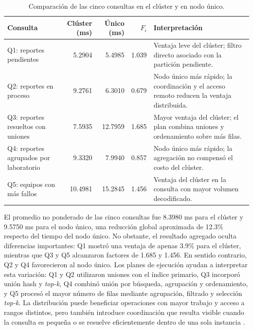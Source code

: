 \documentclass[12pt,a4paper]{article}
\begin{document}
\begin{table}[H]
  \centering
  \caption{Comparación de las cinco consultas en el clúster y en nodo único.}
  \label{tab:comparacion-cluster-single}
  \scriptsize
  \begin{tabular}{@{}p{4.1cm}rrrp{4.3cm}@{}}
    \toprule
    \textbf{Consulta} & \textbf{Clúster (ms)} & \textbf{Único (ms)} & \textbf{$F_i$} & \textbf{Interpretación} \\
    \midrule
    Q1: reportes pendientes & 5.2904 & 5.4985 & 1.039 & Ventaja leve del clúster; filtro directo asociado con la partición pendiente. \\
    Q2: reportes en proceso & 9.2761 & 6.3010 & 0.679 & Nodo único más rápido; la coordinación y el acceso remoto reducen la ventaja distribuida. \\
    Q3: reportes resueltos con uniones & 7.5935 & 12.7959 & 1.685 & Mayor ventaja del clúster; el plan combina uniones y ordenamiento sobre más filas. \\
    Q4: reportes agrupados por laboratorio & 9.3320 & 7.9940 & 0.857 & Nodo único más rápido; la agregación no compensó el costo del clúster. \\
    Q5: equipos con más fallos & 10.4981 & 15.2845 & 1.456 & Ventaja del clúster en la consulta con mayor volumen decodificado. \\
    \bottomrule
  \end{tabular}
\end{table}

El promedio no ponderado de las cinco consultas fue 8.3980 ms para el clúster y 9.5750 ms para el nodo único, una reducción global aproximada de 12.3\% respecto del tiempo del nodo único. No obstante, el resultado agregado oculta diferencias importantes: Q1 mostró una ventaja de apenas 3.9\% para el clúster, mientras que Q3 y Q5 alcanzaron factores de 1.685 y 1.456. En sentido contrario, Q2 y Q4 favorecieron al nodo único. Los planes de ejecución ayudan a interpretar esta variación: Q1 y Q2 utilizaron uniones con el índice primario, Q3 incorporó unión hash y \textit{top-k}, Q4 combinó unión por búsqueda, agrupación y ordenamiento, y Q5 procesó el mayor número de filas mediante agrupación, filtrado y selección \textit{top-k}. La distribución puede beneficiar operaciones con mayor trabajo y acceso a rangos distintos, pero también introduce coordinación que resulta visible cuando la consulta es pequeña o se resuelve eficientemente dentro de una sola instancia \cite{taft2020cockroachdb,pina2023newsql}.
\end{document}
